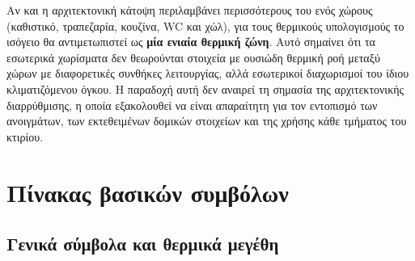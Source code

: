 \documentclass[12pt,a4paper]{article}
\begin{document}
Αν και η αρχιτεκτονική κάτοψη περιλαμβάνει περισσότερους του ενός χώρους
(καθιστικό, τραπεζαρία, κουζίνα, WC και χώλ), για τους θερμικούς υπολογισμούς το
ισόγειο θα αντιμετωπιστεί ως \textbf{μία ενιαία θερμική ζώνη}. Αυτό σημαίνει ότι τα
εσωτερικά χωρίσματα δεν θεωρούνται στοιχεία με ουσιώδη θερμική ροή μεταξύ χώρων με
διαφορετικές συνθήκες λειτουργίας, αλλά εσωτερικοί διαχωρισμοί του ίδιου
κλιματιζόμενου όγκου. Η παραδοχή αυτή δεν αναιρεί τη σημασία της αρχιτεκτονικής
διαρρύθμισης, η οποία εξακολουθεί να είναι απαραίτητη για τον εντοπισμό των
ανοιγμάτων, των εκτεθειμένων δομικών στοιχείων και της χρήσης κάθε τμήματος του
κτιρίου.

\section{Πίνακας βασικών συμβόλων}

\subsection{Γενικά σύμβολα και θερμικά μεγέθη}
\end{document}

